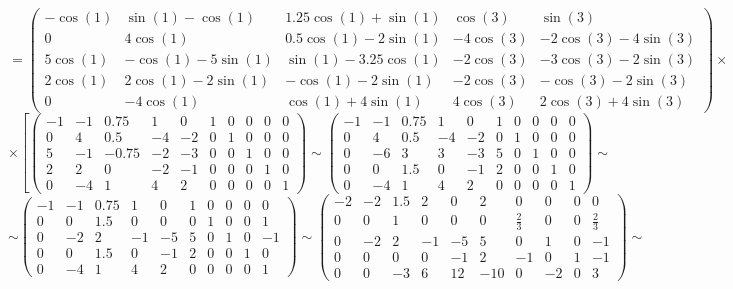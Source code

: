\documentclass{article}
\begin{document}
$$= \begin{pmatrix}
-\cos(1) & \sin(1)-\cos(1) & 1.25\cos(1)+\sin(1) & \cos(3) & \sin(3) \\
0 & 4\cos(1) & 0.5\cos(1)-2\sin(1) & -4\cos(3) & -2\cos(3)-4\sin(3) \\
5\cos(1) & -\cos(1)-5\sin(1) & \sin(1)-3.25\cos(1) & -2\cos(3) & -3\cos(3)-2\sin(3) \\
2\cos(1) & 2\cos(1)-2\sin(1) & -\cos(1)-2\sin(1) & -2\cos(3) & -\cos(3)-2\sin(3) \\
0 & -4\cos(1) & \cos(1)+4\sin(1) & 4\cos(3) & 2\cos(3)+4\sin(3)
\end{pmatrix}\times$$
$$\times\left[\left(\begin{array}{ccccc|ccccc}
-1 & -1 & 0.75 & 1 & 0 & 1 & 0 & 0 & 0 & 0\\
0 & 4 & 0.5 & -4 & -2 & 0 & 1 & 0 & 0 & 0\\
5 & -1 & -0.75 & -2 & -3 & 0 & 0 & 1 & 0 & 0\\
2 & 2 & 0 & -2 & -1 & 0 & 0 & 0 & 1 & 0\\
0 & -4 & 1 & 4 & 2 & 0 & 0 & 0 & 0 & 1
\end{array}\right) \sim \left(\begin{array}{ccccc|ccccc}
-1 & -1 & 0.75 & 1 & 0 & 1 & 0 & 0 & 0 & 0\\
0 & 4 & 0.5 & -4 & -2 & 0 & 1 & 0 & 0 & 0\\
0 & -6 & 3 & 3 & -3 & 5 & 0 & 1 & 0 & 0\\
0 & 0 & 1.5 & 0 & -1 & 2 & 0 & 0 & 1 & 0\\
0 & -4 & 1 & 4 & 2 & 0 & 0 & 0 & 0 & 1
\end{array}\right) \sim \right.$$
$$\left.\sim \left(\begin{array}{ccccc|ccccc}
-1 & -1 & 0.75 & 1 & 0 & 1 & 0 & 0 & 0 & 0\\
0 & 0 & 1.5 & 0 & 0 & 0 & 1 & 0 & 0 & 1\\
0 & -2 & 2 & -1 & -5 & 5 & 0 & 1 & 0 & -1\\
0 & 0 & 1.5 & 0 & -1 & 2 & 0 & 0 & 1 & 0\\
0 & -4 & 1 & 4 & 2 & 0 & 0 & 0 & 0 & 1
\end{array}\right)\sim \left(\begin{array}{ccccc|ccccc}
-2 & -2 & 1.5 & 2 & 0 & 2 & 0 & 0 & 0 & 0\\
0 & 0 & 1 & 0 & 0 & 0 & \frac{2}{3} & 0 & 0 & \frac{2}{3}\\
0 & -2 & 2 & -1 & -5 & 5 & 0 & 1 & 0 & -1\\
0 & 0 & 0 & 0 & -1 & 2 & -1 & 0 & 1 & -1\\
0 & 0 & -3 & 6 & 12 & -10 & 0 & -2 & 0 & 3
\end{array}\right)\sim \right.$$
\end{document}

